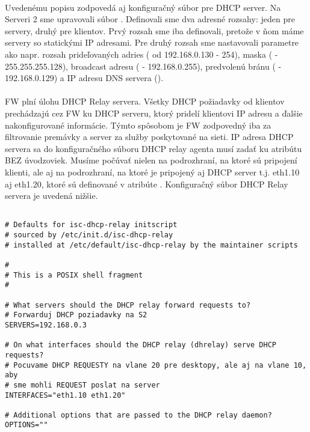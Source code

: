 \paragraph{}
Uvedenému popisu zodpovedá aj konfiguračný súbor pre DHCP server. Na Serveri 2 sme upravovali súbor . Definovali sme dva adresné rozsahy: jeden pre servery, druhý pre klientov. Prvý rozsah sme iba definovali, pretože v ňom máme servery so statickými IP adresami. Pre druhý rozsah sme nastavovali parametre ako napr. rozsah prideľovaných adries ( od 192.168.0.130 - 254), maska ( - 255.255.255.128), broadcast adresu ( - 192.168.0.255), predvolenú bránu ( - 192.168.0.129) a IP adresu DNS servera ().

\paragraph{}
FW plní úlohu DHCP Relay servera. Všetky DHCP požiadavky od klientov prechá\-dzajú cez FW ku DHCP serveru, ktorý pridelí klientovi IP adresu a ďalšie nakonfigurované informácie. Týmto spôsobom je FW zodpovedný iba za filtrovanie premávky a server za služby poskytované na sieti. IP adresa DHCP servera sa do konfiguračného súboru  DHCP relay agenta musí zadať ku atribútu  BEZ úvodzoviek. Musíme počúvať nielen na podrozhraní, na ktoré sú pripojení klienti, ale aj na podrozhraní, na ktoré je pripojený aj DHCP server t.j. eth1.10 aj eth1.20, ktoré sú definované v atribúte . Konfiguračný súbor DHCP Relay servera je uvedená nižšie.

\noindent
{\selectfont

\begin{small}

\begin{verbatim}

# Defaults for isc-dhcp-relay initscript
# sourced by /etc/init.d/isc-dhcp-relay
# installed at /etc/default/isc-dhcp-relay by the maintainer scripts

#
# This is a POSIX shell fragment
#

# What servers should the DHCP relay forward requests to?
# Forwarduj DHCP poziadavky na S2
SERVERS=192.168.0.3

# On what interfaces should the DHCP relay (dhrelay) serve DHCP requests?
# Pocuvame DHCP REQUESTY na vlane 20 pre desktopy, ale aj na vlane 10, aby 
# sme mohli REQUEST poslat na server
INTERFACES="eth1.10 eth1.20"

# Additional options that are passed to the DHCP relay daemon?
OPTIONS=""

\end{verbatim}

\end{small}

}


